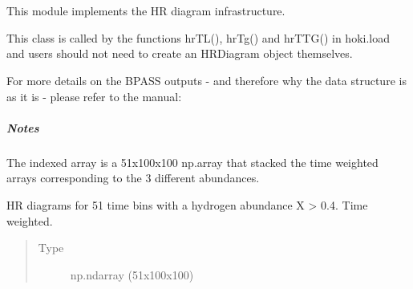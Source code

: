 \documentclass[letterpaper,10pt,english]{sphinxmanual}
\begin{document}
\chapter{}
\label{\detokenize{hrdiagrams:module-hoki.hrdiagrams}}\label{\detokenize{hrdiagrams::doc}}\label{\detokenize{hrdiagrams:hrdiagrams}}
This module implements the HR diagram infrastructure.

\begin{fulllineitems}
\label{\detokenize{hrdiagrams:hoki.hrdiagrams.HRDiagram}}

This class is called by the functions hrTL(), hrTg() and hrTTG() in hoki.load and users should
not need to create an HRDiagram object themselves.

For more details on the BPASS outputs - and therefore why the data structure is as it is -
please refer to the manual:
\paragraph{Notes}

 The indexed array is a 51x100x100 np.array that stacked the time
weighted arrays corresponding to the 3 different abundances.

\begin{fulllineitems}
\label{\detokenize{hrdiagrams:hoki.hrdiagrams.HRDiagram.self.high_H}}
HR diagrams for 51 time bins with a hydrogen abundance X \textgreater{} 0.4. Time weighted.
\begin{quote}\begin{description}
\item[{Type}] \leavevmode
np.ndarray (51x100x100)

\end{description}\end{quote}


\end{fulllineitems}
\end{fulllineitems}
\end{document}
